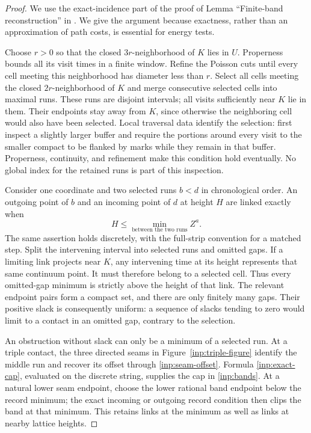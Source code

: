 \begin{proof}
We use the exact-incidence part of the proof of Lemma ``Finite-band
reconstruction'' in \cite{MetricMaps}.  We give the argument because
exactness, rather than an approximation of path costs, is essential
for energy tests.

Choose $r>0$ so that the closed $3r$-neighborhood of $K$ lies in $U$.
Properness bounds all its visit times in a finite window.  Refine the
Poisson cuts until every cell meeting this neighborhood has diameter
less than $r$.  Select all cells meeting the closed $2r$-neighborhood
of $K$ and merge consecutive selected cells into maximal runs.  These
runs are disjoint intervals; all visits sufficiently near $K$ lie in
them.  Their endpoints stay away from $K$, since otherwise the
neighboring cell would also have been selected.  Local traversal
data identify the selection: first inspect a slightly larger buffer
and require the portions around every visit to the smaller compact
to be flanked by marks while they remain in that buffer.  Properness,
continuity, and refinement make this condition hold eventually.
No global index for the retained runs is part of this inspection.

Consider one coordinate and two selected runs $b<d$ in chronological
order.  An outgoing point of $b$ and an incoming point of $d$ at
height $H$ are linked exactly when
\begin{equation}\label{inp:gap-test}
 H\le\min_{\text{between the two runs}} Z^a.
\end{equation}
The same assertion holds discretely, with the full-strip convention
for a matched step.  Split the intervening interval into selected
runs and omitted gaps.  If a limiting link projects near $K$, any
intervening time at its height represents that same continuum point.
It must therefore belong to a selected cell.  Thus every omitted-gap
minimum is strictly above the height of that link.  The relevant
endpoint pairs form a compact set, and there are only finitely many
gaps.  Their positive slack is consequently uniform: a sequence of
slacks tending to zero would limit to a contact in an omitted gap,
contrary to the selection.

An obstruction without slack can only be a minimum of a selected run.
At a triple contact, the three directed seams in
Figure~\ref{inp:triple-figure} identify the middle run and recover
its offset through \eqref{inp:seam-offset}.  Formula
\eqref{inp:exact-cap}, evaluated on the discrete string, supplies
the cap in \eqref{inp:bands}.  At a natural
lower seam endpoint, choose the lower rational band endpoint below
the record minimum; the exact incoming or outgoing record condition
then clips the band at that minimum.  This retains links at the
minimum as well as links at nearby lattice heights.


\end{proof}
